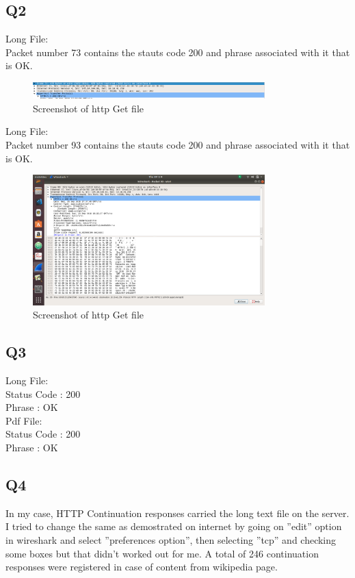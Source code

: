 \documentclass{article}
\begin{document}
\subsection{Q2}

Long File: \\
Packet number 73 contains the stauts code 200 and phrase associated with it that is OK.\\
  \begin{figure}[H]
 \centering
 \includegraphics[width=0.8\textwidth]{../Set3/q2/a.png}
 \caption{\label{fig:PING}Screenshot of http Get file}
 \end{figure}
 
 Long File: \\
Packet number 93 contains the stauts code 200 and phrase associated with it that is OK.\\
  \begin{figure}[H]
 \centering
 \includegraphics[width=0.8\textwidth]{../Set3/q2/b.png}
 \caption{\label{fig:PING}Screenshot of http Get file}
 \end{figure}
\subsection{Q3}
Long File:\\
Status Code : 200\\
Phrase : OK\\

Pdf File:\\
Status Code : 200\\
Phrase : OK\\

\subsection{Q4}
In my case, HTTP Continuation responses carried the long text file on the
server. I tried to change the same as demostrated on internet by going on
”edit” option in wireshark and select ”preferences option”, then selecting ”tcp”
and checking some boxes but that didn’t worked out for me. A total of 246
continuation responses were registered in case of content from wikipedia page.\\
\end{document}
